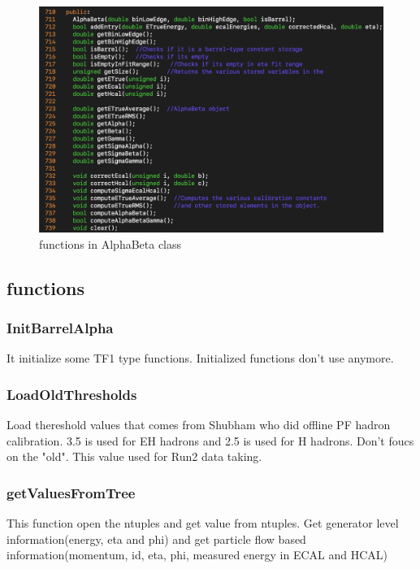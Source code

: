 \documentclass{cernrep}
\begin{document}
\begin{figure}[!]
\includegraphics[width=1.0\textwidth]{fig/AlphaBeta.png}
\caption{functions in AlphaBeta class}
\label{AlphaBeta}
\end{figure}

\subsection{functions}

\subsubsection{InitBarrelAlpha}

It initialize some TF1 type functions. Initialized functions don't use anymore.

\subsubsection {LoadOldThresholds}

Load thereshold values that comes from Shubham who did offline PF hadron calibration. 3.5 is used for EH hadrons and 2.5 is used for H hadrons. Don't foucs on the "old". This value used for Run2 data taking.

\subsubsection {getValuesFromTree}
This function open the ntuples and get value from ntuples. Get generator level information(energy, eta and phi) and get particle flow based information(momentum, id, eta, phi, measured energy in ECAL and HCAL)
\end{document}
